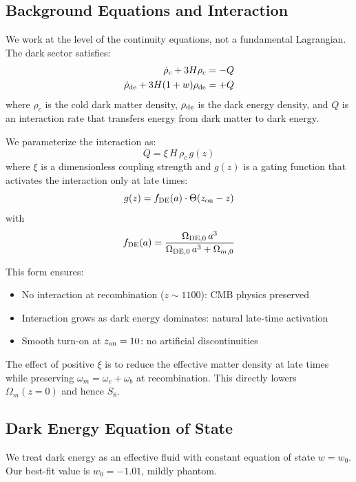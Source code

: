 \documentclass[twocolumn,showpacs,preprintnumbers,amsmath,amssymb,prd]{revtex4-2}
\begin{document}
\subsection{Background Equations and Interaction}

We work at the level of the continuity equations, not a fundamental Lagrangian. The dark sector satisfies:
\begin{align}
\dot{\rho}_c + 3H\rho_c &= -Q \label{eq:cont_cdm}\\
\dot{\rho}_{\rm de} + 3H(1+w)\rho_{\rm de} &= +Q \label{eq:cont_de}
\end{align}
where $\rho_c$ is the cold dark matter density, $\rho_{\rm de}$ is the dark energy density, and $Q$ is an interaction rate that transfers energy from dark matter to dark energy.

We parameterize the interaction as:
\begin{equation}
Q = \xi \, H \, \rho_c \, g(z)
\label{eq:Q}
\end{equation}
where $\xi$ is a dimensionless coupling strength and $g(z)$ is a gating function that activates the interaction only at late times:
\begin{equation}
g(z) = f_{\rm DE}(a) \cdot \Theta(z_{\rm on} - z)
\end{equation}
with
\begin{equation}
f_{\rm DE}(a) = \frac{\Omega_{\rm DE,0} \, a^3}{\Omega_{\rm DE,0} \, a^3 + \Omega_{m,0}}
\end{equation}

This form ensures:
\begin{itemize}
    \item No interaction at recombination ($z \sim 1100$): CMB physics preserved
    \item Interaction grows as dark energy dominates: natural late-time activation
    \item Smooth turn-on at $z_{\rm on} = 10$: no artificial discontinuities
\end{itemize}

The effect of positive $\xi$ is to reduce the effective matter density at late times while preserving $\omega_m = \omega_c + \omega_b$ at recombination. This directly lowers $\Omega_m(z=0)$ and hence $S_8$.

\subsection{Dark Energy Equation of State}

We treat dark energy as an effective fluid with constant equation of state $w = w_0$. Our best-fit value is $w_0 = -1.01$, mildly phantom.
\end{document}

